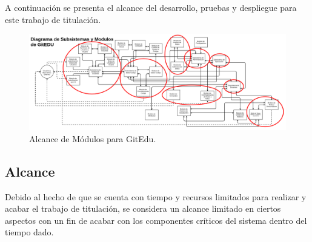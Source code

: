 A continuación se presenta el alcance del desarrollo, pruebas y despliegue para este trabajo de titulación.

\pagebreak

\begin{landscape}

\begin{figure}
  \begin{center}
    \includegraphics[width=1.7\textwidth]{Figures/alc_mod_ge.png}
  \end{center}
  \caption{Alcance de Módulos para GitEdu.}
  \label{alc_mod_ge}
\end{figure}

\end{landscape}

\subsection{Alcance}

Debido al hecho de que se cuenta con tiempo y recursos limitados para realizar y acabar el trabajo de titulación, se considera un alcance limitado en ciertos aspectos con un fin de acabar con los componentes críticos del sistema dentro del tiempo dado.

